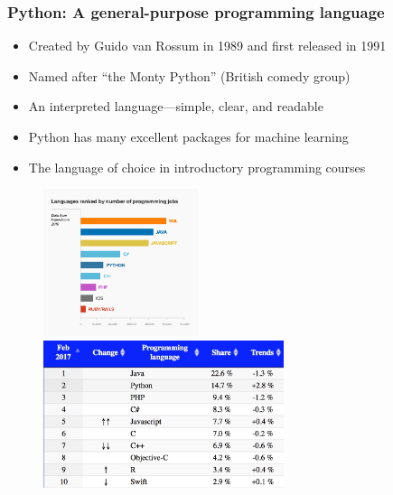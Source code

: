 \begin{frame}
  \MyLogo
  \frametitle{Python: A general-purpose programming language}  

\small 

\begin{itemize}

\item Created by Guido van Rossum in 1989 and first released in 1991

\item Named after ``the Monty Python'' (British comedy group)

\item An interpreted language---simple, clear, and readable 

\item Python has many excellent packages for machine learning

\item The language of choice in introductory programming courses

\end{itemize}

\begin{figure}[htbp] %
   \includegraphics[height=1.7in]{figures/ComputerLanguagesDemand.jpg} 
   \includegraphics[height=1.7in]{figures/ComputerLanguagesShare.jpg} 
\end{figure}

\end{frame}


